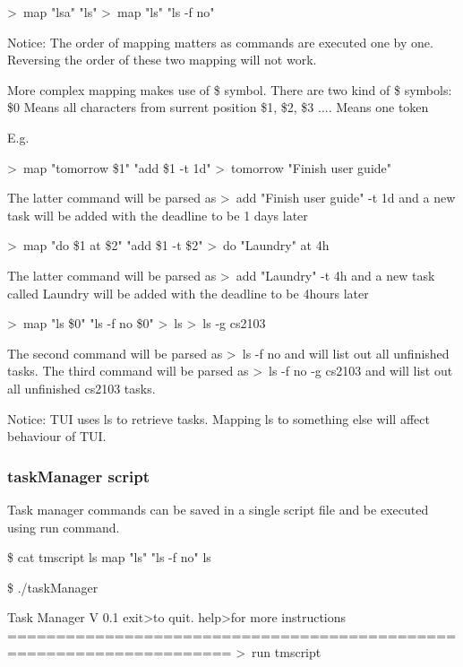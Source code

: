 \documentclass[12pt, a4paper]{article}
\begin{document}
    \textgreater \ map "lsa" "ls"
    \textgreater \ map "ls" "ls -f no"

Notice: The order of mapping matters as commands are executed one by one. Reversing the order of these two mapping will not work.

More complex mapping makes use of \$ symbol. There are two kind of \$ symbols:
    \$0 Means all characters from surrent position
    \$1, \$2, \$3 .... Means one token

E.g.
    
    \textgreater \ map "tomorrow \$1" "add \$1 -t 1d"
    \textgreater \ tomorrow "Finish user guide"
    
    The latter command will be parsed as
    \textgreater \ add "Finish user guide" -t 1d
    and a new task will be added with the deadline to be 1 days later

    \textgreater \ map "do \$1 at \$2" "add \$1 -t \$2"
    \textgreater \ do "Laundry" at 4h
    
    The latter command will be parsed as
    \textgreater \ add "Laundry" -t 4h
    and a new task called Laundry will be added with the deadline to be 4hours later

    \textgreater \ map "ls \$0" "ls -f no \$0"
    \textgreater \ ls
    \textgreater \ ls -g cs2103
    
    The second command will be parsed as
    \textgreater \ ls -f no 
    and will list out all unfinished tasks.
    The third command will be parsed as
    \textgreater \ ls -f no -g cs2103
    and will list out all unfinished cs2103 tasks.

Notice: TUI uses ls to retrieve tasks. Mapping ls to something else will affect behaviour of TUI.
    
\subsubsection{taskManager script}

Task manager commands can be saved in a single script file and be executed using run command.

    \$ cat tmscript 
    ls
    map "ls" "ls -f no"
    ls

    \$ ./taskManager

     Task Manager V 0.1 
     exit\textlessenter\textgreater to quit. help\textlessenter\textgreater for more instructions
    =====================================================================
    \textgreater \ run tmscript
\end{document}
